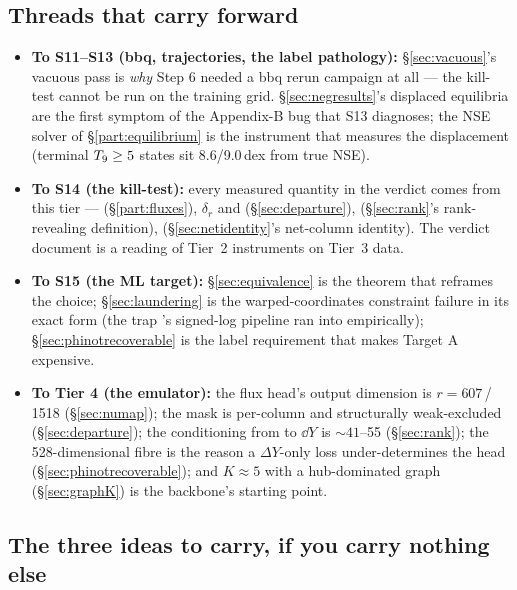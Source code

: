\subsection*{Threads that carry forward}
\label{sec:threads}

\begin{itemize}
\item \textbf{To S11--S13 (bbq, trajectories, the label pathology):}
  \S\ref{sec:vacuous}'s vacuous pass is \emph{why} Step 6 needed a bbq rerun
  campaign at all --- the kill-test cannot be run on the training grid.
  \S\ref{sec:negresults}'s displaced equilibria are the first symptom of the
  Appendix-B bug that S13 diagnoses; the NSE solver of
  \S\ref{part:equilibrium} is the instrument that measures the displacement
  (terminal $T_{9} \ge 5$ states sit 8.6/9.0\,dex from true NSE).
\item \textbf{To S14 (the kill-test):} every measured quantity in the verdict
  comes from this tier --- \kap{} (\S\ref{part:fluxes}), $\delta_r$ and
   (\S\ref{sec:departure}), 
  (\S\ref{sec:rank}'s rank-revealing definition), 
  (\S\ref{sec:netidentity}'s net-column identity). The verdict document is a
  reading of Tier~2 instruments on Tier~3 data.
\item \textbf{To S15 (the ML target):} \S\ref{sec:equivalence} is the theorem
  that reframes the choice; \S\ref{sec:laundering} is the warped-coordinates
  constraint failure in its exact form (the trap \citealp{kim2026}'s signed-log
  pipeline ran into empirically); \S\ref{sec:phinotrecoverable} is the label
  requirement that makes Target A expensive.
\item \textbf{To Tier 4 (the emulator):} the flux head's output dimension is
  $r = 607$\,/\,1518 (\S\ref{sec:numap}); the mask is per-column and
  structurally weak-excluded (\S\ref{sec:departure}); the conditioning from
  \netflux{} to $\dd Y$ is ${\sim}41$--55 (\S\ref{sec:rank}); the
  528-dimensional fibre is the reason a $\Delta Y$-only loss under-determines
  the head (\S\ref{sec:phinotrecoverable}); and $K \approx 5$ with a
  hub-dominated graph (\S\ref{sec:graphK}) is the backbone's starting point.
\end{itemize}

\subsection*{The three ideas to carry, if you carry nothing else}
\label{sec:threeideas}

